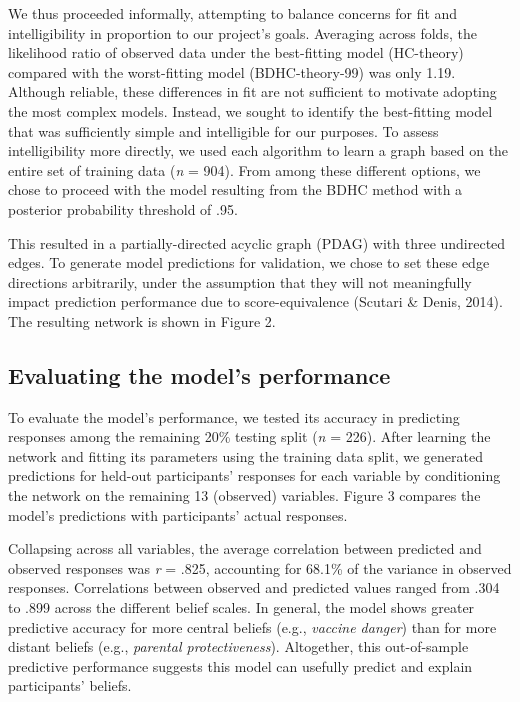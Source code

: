 \documentclass[10pt, letterpaper]{article}
\begin{document}
We thus proceeded informally, attempting to balance concerns for fit and
intelligibility in proportion to our project's goals. Averaging across
folds, the likelihood ratio of observed data under the best-fitting
model (HC-theory) compared with the worst-fitting model (BDHC-theory-99)
was only 1.19. Although reliable, these differences in fit are not
sufficient to motivate adopting the most complex models. Instead, we
sought to identify the best-fitting model that was sufficiently simple
and intelligible for our purposes. To assess intelligibility more
directly, we used each algorithm to learn a graph based on the entire
set of training data (\emph{n} = 904). From among these different
options, we chose to proceed with the model resulting from the BDHC
method with a posterior probability threshold of .95.

This resulted in a partially-directed acyclic graph (PDAG) with three
undirected edges. To generate model predictions for validation, we chose
to set these edge directions arbitrarily, under the assumption that they
will not meaningfully impact prediction performance due to
score-equivalence (Scutari \& Denis, 2014). The resulting network is
shown in Figure 2.

\subsection{Evaluating the model's
performance}\label{evaluating-the-models-performance}

To evaluate the model's performance, we tested its accuracy in
predicting responses among the remaining 20\% testing split (\emph{n} =
226). After learning the network and fitting its parameters using the
training data split, we generated predictions for held-out participants'
responses for each variable by conditioning the network on the remaining
13 (observed) variables. Figure 3 compares the model's predictions with
participants' actual responses.

Collapsing across all variables, the average correlation between
predicted and observed responses was \emph{r} = .825, accounting for
68.1\% of the variance in observed responses. Correlations between
observed and predicted values ranged from .304 to .899 across the
different belief scales. In general, the model shows greater predictive
accuracy for more central beliefs (e.g., \emph{vaccine danger}) than for
more distant beliefs (e.g., \emph{parental protectiveness}). Altogether,
this out-of-sample predictive performance suggests this model can
usefully predict and explain participants' beliefs.
\end{document}
